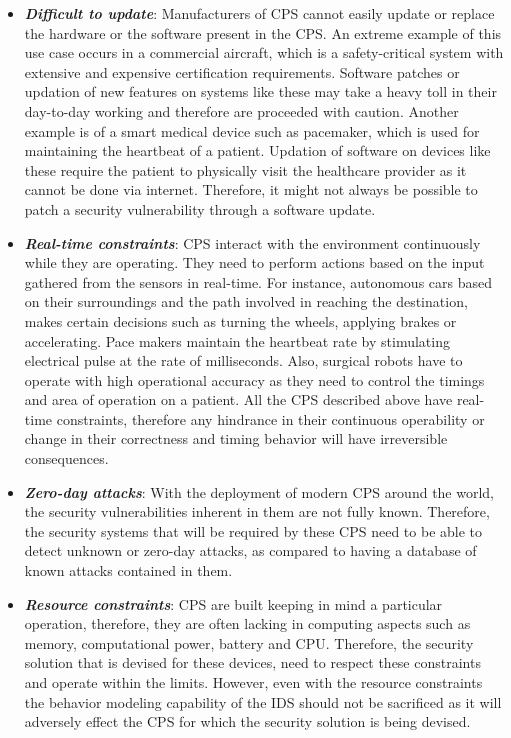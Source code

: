 \begin{itemize}
\item  \textbf{\textit{Difficult to update}}: Manufacturers of \ac{CPS} cannot easily update or replace the hardware or the software present in the \ac{CPS}. An extreme example of this use case occurs in a commercial aircraft, which is a safety-critical system with extensive and expensive certification requirements. Software patches or updation of new features on systems like these may take a heavy toll in their day-to-day working and therefore are proceeded with caution. Another example is of a smart medical device such as pacemaker, which is used for maintaining the heartbeat of a patient. Updation of software on devices like these require the patient to physically visit the healthcare provider as it cannot be done via internet. Therefore, it might not always be possible to patch a security vulnerability through a software update.

\item \textbf{\textit{Real-time constraints}}: \ac{CPS} interact with the environment continuously while they are operating. They need to perform actions based on the input gathered from the sensors in real-time. For instance, autonomous cars based on their surroundings and the path involved in reaching the destination, makes certain decisions such as turning the wheels, applying brakes or accelerating. Pace makers maintain the heartbeat rate by stimulating electrical pulse at the rate of milliseconds. Also, surgical robots have to operate with high operational accuracy as they need to control the timings and area of operation on a patient. All the \ac{CPS} described above have real-time constraints, therefore any hindrance in their continuous operability or change in their correctness and timing behavior will have irreversible consequences.

\item \textbf{\textit{Zero-day attacks}}: With the deployment of modern \ac{CPS} around the world, the security vulnerabilities inherent in them are not fully known. Therefore, the security systems that will be required by these \ac{CPS} need to be able to detect unknown or zero-day attacks, as compared to having a database of known attacks contained in them.

\item \textbf{\textit{Resource constraints}}: \ac{CPS} are built keeping in mind a particular operation, therefore, they are often lacking in computing aspects such as memory, computational power, battery and CPU. Therefore, the security solution that is devised for these devices, need to respect these constraints and operate within the limits. However, even with the resource constraints the behavior modeling capability of the \ac{IDS} should not be sacrificed as it will adversely effect the \ac{CPS} for which the security solution is being devised.


\end{itemize}
